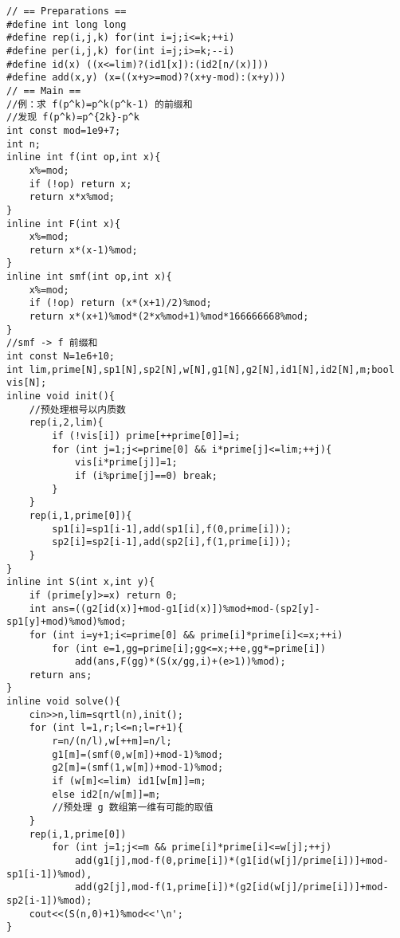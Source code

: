 \begin{verbatim}
// == Preparations ==
#define int long long
#define rep(i,j,k) for(int i=j;i<=k;++i)
#define per(i,j,k) for(int i=j;i>=k;--i)
#define id(x) ((x<=lim)?(id1[x]):(id2[n/(x)]))
#define add(x,y) (x=((x+y>=mod)?(x+y-mod):(x+y)))
// == Main ==
//例：求 f(p^k)=p^k(p^k-1) 的前缀和
//发现 f(p^k)=p^{2k}-p^k
int const mod=1e9+7;
int n;
inline int f(int op,int x){
    x%=mod;
    if (!op) return x;
    return x*x%mod;
}
inline int F(int x){
    x%=mod;
    return x*(x-1)%mod;
}
inline int smf(int op,int x){
    x%=mod;
    if (!op) return (x*(x+1)/2)%mod;
    return x*(x+1)%mod*(2*x%mod+1)%mod*166666668%mod;
}
//smf -> f 前缀和
int const N=1e6+10;
int lim,prime[N],sp1[N],sp2[N],w[N],g1[N],g2[N],id1[N],id2[N],m;bool vis[N];
inline void init(){
    //预处理根号以内质数
    rep(i,2,lim){
        if (!vis[i]) prime[++prime[0]]=i;
        for (int j=1;j<=prime[0] && i*prime[j]<=lim;++j){
            vis[i*prime[j]]=1;
            if (i%prime[j]==0) break;
        }
    }
    rep(i,1,prime[0]){
        sp1[i]=sp1[i-1],add(sp1[i],f(0,prime[i]));
        sp2[i]=sp2[i-1],add(sp2[i],f(1,prime[i]));
    }
}
inline int S(int x,int y){
    if (prime[y]>=x) return 0;
    int ans=((g2[id(x)]+mod-g1[id(x)])%mod+mod-(sp2[y]-sp1[y]+mod)%mod)%mod;
    for (int i=y+1;i<=prime[0] && prime[i]*prime[i]<=x;++i)
        for (int e=1,gg=prime[i];gg<=x;++e,gg*=prime[i])
            add(ans,F(gg)*(S(x/gg,i)+(e>1))%mod);
    return ans;
}
inline void solve(){
    cin>>n,lim=sqrtl(n),init();
    for (int l=1,r;l<=n;l=r+1){
        r=n/(n/l),w[++m]=n/l;
        g1[m]=(smf(0,w[m])+mod-1)%mod;
        g2[m]=(smf(1,w[m])+mod-1)%mod;
        if (w[m]<=lim) id1[w[m]]=m;
        else id2[n/w[m]]=m;
        //预处理 g 数组第一维有可能的取值
    }
    rep(i,1,prime[0])
        for (int j=1;j<=m && prime[i]*prime[i]<=w[j];++j)
            add(g1[j],mod-f(0,prime[i])*(g1[id(w[j]/prime[i])]+mod-sp1[i-1])%mod),
            add(g2[j],mod-f(1,prime[i])*(g2[id(w[j]/prime[i])]+mod-sp2[i-1])%mod);
    cout<<(S(n,0)+1)%mod<<'\n';
}
\end{verbatim}
